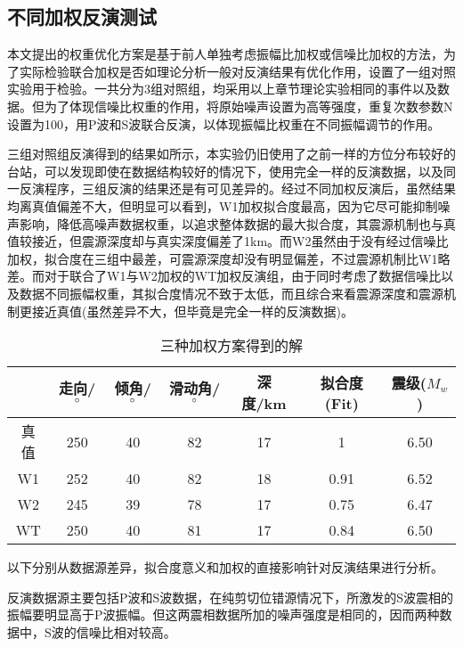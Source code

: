 \subsection{不同加权反演测试}
本文提出的权重优化方案是基于前人单独考虑振幅比加权或信噪比加权的方法，为了实际检验联合加权是否如理论分析一般对反演结果有优化作用，设置了一组对照实验用于检验。一共分为3组对照组，均采用以上章节理论实验相同的事件以及数据。但为了体现信噪比权重的作用，将原始噪声设置为高等强度，重复次数参数N设置为100，用P波和S波联合反演，以体现振幅比权重在不同振幅调节的作用。

三组对照组反演得到的结果如所示，本实验仍旧使用了之前一样的方位分布较好的台站，可以发现即使在数据结构较好的情况下，使用完全一样的反演数据，以及同一反演程序，三组反演的结果还是有可见差异的。经过不同加权反演后，虽然结果均离真值偏差不大，但明显可以看到，W1加权拟合度最高，因为它尽可能抑制噪声影响，降低高噪声数据权重，以追求整体数据的最大拟合度，其震源机制也与真值较接近，但震源深度却与真实深度偏差了1km。而W2虽然由于没有经过信噪比加权，拟合度在三组中最差，可震源深度却没有明显偏差，不过震源机制比W1略差。而对于联合了W1与W2加权的WT加权反演组，由于同时考虑了数据信噪比以及数据不同振幅权重，其拟合度情况不致于太低，而且综合来看震源深度和震源机制更接近真值(虽然差异不大，但毕竟是完全一样的反演数据)。
\begin{table}[ht]
\centering
\caption{三种加权方案得到的解}
\label{tab3_01}
    \begin{tabular}{c c c c c c c}
    \hline
     & 走向/$^\circ$ & 倾角/$^\circ$ & 滑动角/$^\circ$ & 深度/km & 拟合度(Fit) & 震级($M_w$)\\
    \hline
    真值	& 250 & 40 & 82 & 17 & 1	& 6.50\\
    W1		& 252 & 40 & 82 & 18 & 0.91 & 6.52\\
    W2		& 245 & 39 & 78 & 17 & 0.75 & 6.47\\
    WT		& 250 & 40 & 81 & 17 & 0.84 & 6.50\\
    \hline
    \end{tabular}
\end{table}

以下分别从数据源差异，拟合度意义和加权的直接影响针对反演结果进行分析。

反演数据源主要包括P波和S波数据，在纯剪切位错源情况下，所激发的S波震相的振幅要明显高于P波振幅。但这两震相数据所加的噪声强度是相同的，因而两种数据中，S波的信噪比相对较高。

